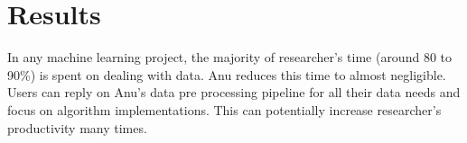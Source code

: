 \documentclass[../main.tex]{subfiles}
\begin{document}
\section{Results}

In any machine learning project, the majority of researcher's time (around 80 to 90\%) is spent on dealing with data.
Anu reduces this time to almost negligible.
Users can reply on Anu's data pre processing pipeline for all their data needs and focus on algorithm implementations.
This can potentially increase researcher's productivity many times.
\end{document}
